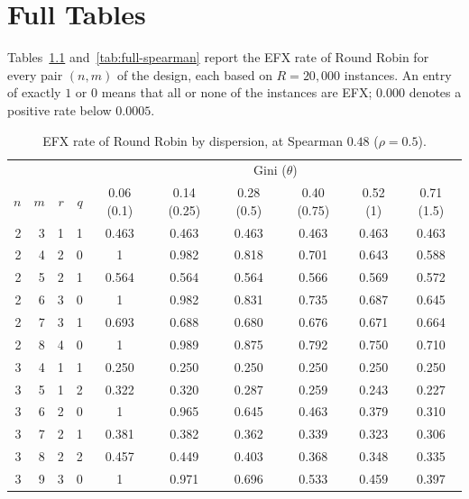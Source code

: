 \chapter{Full Tables}\label{app:tables}

Tables~\ref{tab:full-gini} and~\ref{tab:full-spearman} report the EFX rate of Round Robin for
every pair $(n,m)$ of the design, each based on $R=20{,}000$ instances. An entry of exactly $1$ or
$0$ means that all or none of the instances are EFX; $0.000$ denotes a positive rate below
$0.0005$.

\begin{table}[p]
  \centering
  \caption{EFX rate of Round Robin by dispersion, at Spearman $0.48$ ($\rho=0.5$).}
  \label{tab:full-gini}
  \footnotesize
  \begin{tabular}{rrrr cccccc}
    \toprule
    & & & & \multicolumn{6}{c}{Gini ($\theta$)} \\
    $n$ & $m$ & $r$ & $q$ & 0.06 (0.1) & 0.14 (0.25) & 0.28 (0.5) & 0.40 (0.75) & 0.52 (1) & 0.71 (1.5) \\
    \midrule
2 & 3 & 1 & 1 & 0.463 & 0.463 & 0.463 & 0.463 & 0.463 & 0.463 \\
2 & 4 & 2 & 0 & 1 & 0.982 & 0.818 & 0.701 & 0.643 & 0.588 \\
2 & 5 & 2 & 1 & 0.564 & 0.564 & 0.564 & 0.566 & 0.569 & 0.572 \\
2 & 6 & 3 & 0 & 1 & 0.982 & 0.831 & 0.735 & 0.687 & 0.645 \\
2 & 7 & 3 & 1 & 0.693 & 0.688 & 0.680 & 0.676 & 0.671 & 0.664 \\
2 & 8 & 4 & 0 & 1 & 0.989 & 0.875 & 0.792 & 0.750 & 0.710 \\
\midrule
3 & 4 & 1 & 1 & 0.250 & 0.250 & 0.250 & 0.250 & 0.250 & 0.250 \\
3 & 5 & 1 & 2 & 0.322 & 0.320 & 0.287 & 0.259 & 0.243 & 0.227 \\
3 & 6 & 2 & 0 & 1 & 0.965 & 0.645 & 0.463 & 0.379 & 0.310 \\
3 & 7 & 2 & 1 & 0.381 & 0.382 & 0.362 & 0.339 & 0.323 & 0.306 \\
3 & 8 & 2 & 2 & 0.457 & 0.449 & 0.403 & 0.368 & 0.348 & 0.335 \\
3 & 9 & 3 & 0 & 1 & 0.971 & 0.696 & 0.533 & 0.459 & 0.397 \\

\end{tabular}
\end{table}
